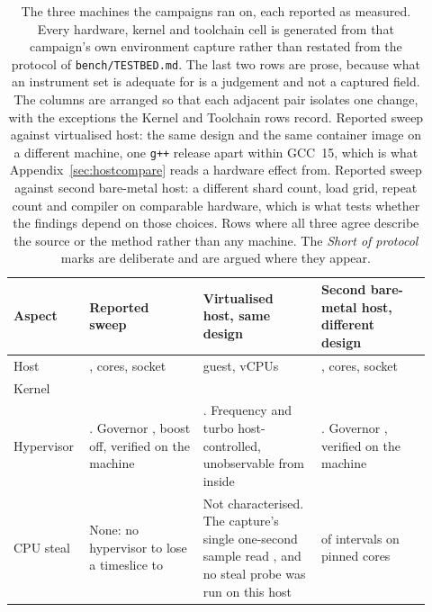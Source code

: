 \documentclass[english,oneside,a4paper,censored,csm,software-track-2020]{HYthesisML}
\renewcommand{\arraystretch}{0.95}
\begin{document}
\begin{appendices}
\begin{table}[ht]
\centering
\small
\caption[The three measurement hosts]{The three machines the campaigns ran on, each reported as
measured. Every hardware, kernel and toolchain cell is generated from that campaign's own
environment capture rather than restated from the protocol of \texttt{bench/TESTBED.md}. The last
two rows are prose, because what an instrument set is adequate for is a judgement and not a captured
field. The columns are arranged so that each
adjacent pair isolates one change, with the exceptions the Kernel and Toolchain rows record.
Reported sweep against virtualised host: the same design and the same container image on a
different machine, one \texttt{g++} release apart within GCC~15, which is what
Appendix~\ref{sec:hostcompare} reads a hardware effect from.
Reported sweep against second bare-metal host: a different shard count, load grid, repeat count and
compiler on comparable hardware, which is what tests whether the findings depend on those choices.
Rows where all three agree describe the source or the method rather than any machine. The
\emph{Short of protocol} marks are deliberate and are argued where they appear.\label{tab:testbed}}
\renewcommand{\arraystretch}{1.1}
\footnotesize
\begin{tabular}{@{}R{0.14\linewidth} R{0.26\linewidth} R{0.27\linewidth} R{0.25\linewidth}@{}}
\hline\hline
Aspect & Reported sweep & Virtualised host, same design & Second bare-metal host, different design \\
\hline
Host & \MainCpu{}, \MainCores{} cores, \MainSockets{} socket & \GuestCpu{} guest, \GuestCores{} vCPUs & \BmCpu{}, \BmCores{} cores, \BmSockets{} socket \\
Kernel & \MainKernel{} & \GuestKernel{} & \BmKernel{} \\
Hypervisor & \MainVirt{}. Governor \MainGovernor{}, boost off, verified on the machine & \GuestVirt{}. Frequency and turbo host-controlled, unobservable from inside & \BmVirt{}. Governor \BmGovernor{}, verified on the machine \\
CPU steal & None: no hypervisor to lose a timeslice to & Not characterised. The capture's single one-second sample read \GuestSteal{}, and no steal probe was run on this host & \BmStealWithSteal{} of \BmStealIntervals{} intervals on \BmStealCores{} pinned cores \\

\end{tabular}
\end{table}
\end{appendices}
\end{document}
